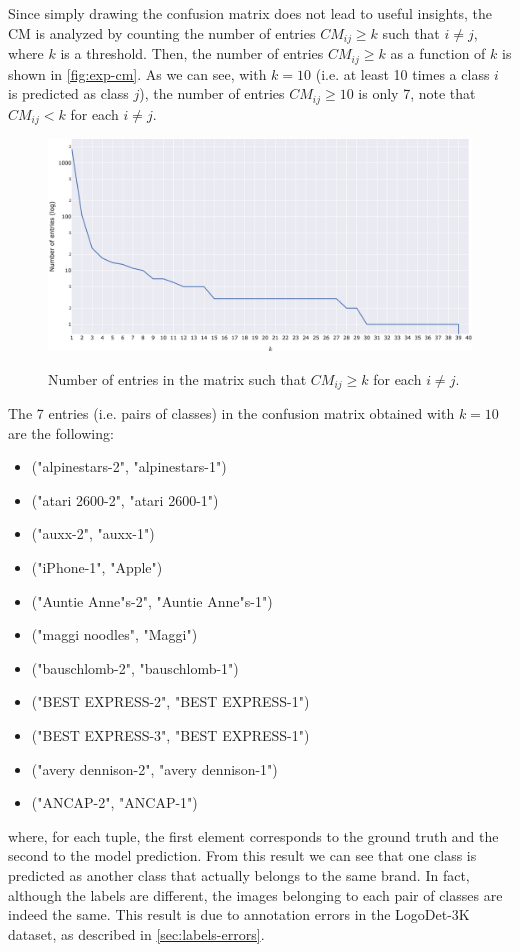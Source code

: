 Since simply drawing the confusion matrix does not lead to useful insights, the CM is analyzed by counting the number of entries $CM_{ij} \geq k$ such that $i \neq j$, where $k$ is a threshold.
Then, the number of entries $CM_{ij} \geq k$ as a function of $k$ is shown in \autoref{fig:exp-cm}.
As we can see, with $k=10$ (i.e. at least 10 times a class $i$ is predicted as class $j$), the number of entries $CM_{ij} \geq 10$ is only 7, note that $CM_{ij} < k$ for each $i \neq j$.

\begin{figure}[H]
	\centering
    {\includegraphics[width=1\textwidth]{images/cm/cm_entry_plot.png} }%
    \caption{Number of entries in the matrix such that $CM_{ij} \geq k$ for each $i \neq j$.}
	\label{fig:exp-cm}
\end{figure}

The 7 entries (i.e. pairs of classes) in the confusion matrix obtained with $k=10$ are the following:
\begin{itemize}
    \item ("alpinestars-2", "alpinestars-1")
    \item ("atari 2600-2", "atari 2600-1")
    \item ("auxx-2", "auxx-1")
    \item ("iPhone-1", "Apple")
    \item ("Auntie Anne"s-2", "Auntie Anne"s-1")
    \item ("maggi noodles", "Maggi")
    \item ("bauschlomb-2", "bauschlomb-1")
    \item ("BEST EXPRESS-2", "BEST EXPRESS-1")
    \item ("BEST EXPRESS-3", "BEST EXPRESS-1")
    \item ("avery dennison-2", "avery dennison-1")
    \item ("ANCAP-2", "ANCAP-1")
\end{itemize}
where, for each tuple, the first element corresponds to the ground truth and the second to the model prediction.
From this result we can see that one class is predicted as another class that actually belongs to the same brand.
In fact, although the labels are different, the images belonging to each pair of classes are indeed the same.
This result is due to annotation errors in the LogoDet-3K dataset, as described in \autoref{sec:labels-errors}.


